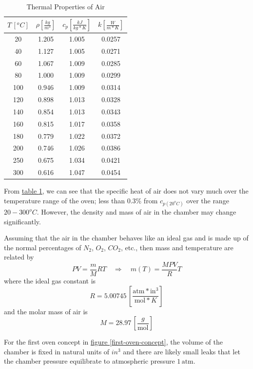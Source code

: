 \documentclass[10pt, twocolumn]{article}
\begin{document}
\begin{table}
	\centering
	\caption{Thermal Properties of Air}
	\begin{tabular}{c | c | c | c}
\hline\hline
$T\,[^{o}C]$	&$\rho\left[\frac{kg}{m^{3}}\right]$	&$c_{p}\left[\frac{kJ}{kg*K}\right]$	&$k\left[\frac{W}{m*K}\right]$	\\
\hline
20	&1.205	&1.005	&0.0257	\\
40	&1.127	&1.005	&0.0271	\\
60	&1.067	&1.009	&0.0285	\\
80	&1.000	&1.009	&0.0299	\\
100	&0.946	&1.009	&0.0314	\\
120	&0.898	&1.013	&0.0328	\\
140	&0.854	&1.013	&0.0343	\\
160	&0.815	&1.017	&0.0358	\\
180	&0.779	&1.022	&0.0372	\\
200	&0.746	&1.026	&0.0386	\\
250	&0.675	&1.034	&0.0421	\\
300	&0.616	&1.047	&0.0454	\\
\hline\hline
	\end{tabular}
	\label{air-properties-table}
\end{table}

From \hyperref[air-properties-table]{table \ref{air-properties-table}},
we can see that the specific heat of air does not vary much over the
temperature range of the oven; less than 0.3\% from $c_{p(20^{o}C)}$
over the range $20-300^{o}C$. However, the density and mass of air
in the chamber may change significantly.

Assuming that the air in the chamber behaves like an ideal gas
and is made up of the normal percentages of $N_{2}$, $O_{2}$, $CO_{2}$, etc., then mass and temperature are related by
\begin{equation*}
PV=\frac{m}{M}RT\quad\Rightarrow\quad m(T)=\frac{MPV}{R}T
\end{equation*}
where the ideal gas constant is
\begin{equation*}
R=5.00745\,\left[\frac{\textrm{atm}*\textrm{in}^{3}}{\textrm{mol}*K}\right]
\end{equation*}
and the molar mass of air is
\begin{equation*}
M=28.97\,\left[\frac{g}{\textrm{mol}}\right]
\end{equation*}

For the first oven concept in
\hyperref[first-oven-concept]{figure \ref{first-oven-concept}},
the volume of the chamber is fixed in natural units of $in^{3}$
and there are likely small leaks that let the chamber
pressure equilibrate to atmospheric pressure $1\,\textrm{atm}$.
\end{document}
